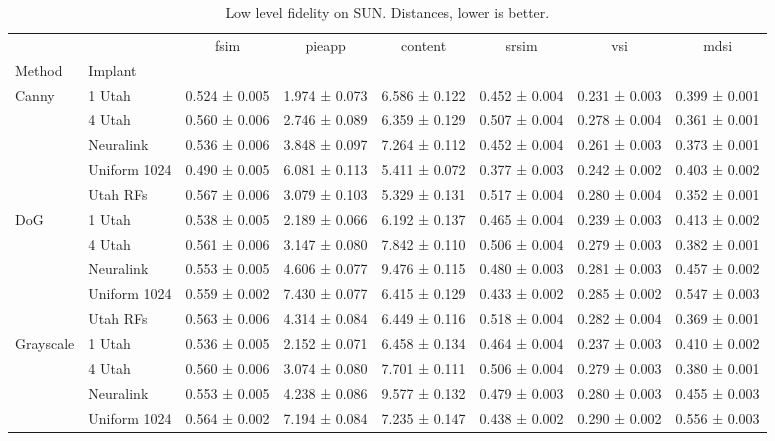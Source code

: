 \begin{table}
\caption{Low level fidelity on SUN. Distances, lower is better.}
\label{tab:low_sun}
\begin{tabular}{llcccccc}
\toprule
 &  & fsim & pieapp & content & srsim & vsi & mdsi \\
Method & Implant &  &  &  &  &  &  \\
\midrule
\multirow[t]{5}{*}{Canny} & 1 Utah & 0.524 ± 0.005 & 1.974 ± 0.073 & 6.586 ± 0.122 & 0.452 ± 0.004 & 0.231 ± 0.003 & 0.399 ± 0.001 \\
 & 4 Utah & 0.560 ± 0.006 & 2.746 ± 0.089 & 6.359 ± 0.129 & 0.507 ± 0.004 & 0.278 ± 0.004 & 0.361 ± 0.001 \\
 & Neuralink & 0.536 ± 0.006 & 3.848 ± 0.097 & 7.264 ± 0.112 & 0.452 ± 0.004 & 0.261 ± 0.003 & 0.373 ± 0.001 \\
 & Uniform 1024 & 0.490 ± 0.005 & 6.081 ± 0.113 & 5.411 ± 0.072 & 0.377 ± 0.003 & 0.242 ± 0.002 & 0.403 ± 0.002 \\
 & Utah RFs & 0.567 ± 0.006 & 3.079 ± 0.103 & 5.329 ± 0.131 & 0.517 ± 0.004 & 0.280 ± 0.004 & 0.352 ± 0.001 \\
\cline{1-8}
\multirow[t]{5}{*}{DoG} & 1 Utah & 0.538 ± 0.005 & 2.189 ± 0.066 & 6.192 ± 0.137 & 0.465 ± 0.004 & 0.239 ± 0.003 & 0.413 ± 0.002 \\
 & 4 Utah & 0.561 ± 0.006 & 3.147 ± 0.080 & 7.842 ± 0.110 & 0.506 ± 0.004 & 0.279 ± 0.003 & 0.382 ± 0.001 \\
 & Neuralink & 0.553 ± 0.005 & 4.606 ± 0.077 & 9.476 ± 0.115 & 0.480 ± 0.003 & 0.281 ± 0.003 & 0.457 ± 0.002 \\
 & Uniform 1024 & 0.559 ± 0.002 & 7.430 ± 0.077 & 6.415 ± 0.129 & 0.433 ± 0.002 & 0.285 ± 0.002 & 0.547 ± 0.003 \\
 & Utah RFs & 0.563 ± 0.006 & 4.314 ± 0.084 & 6.449 ± 0.116 & 0.518 ± 0.004 & 0.282 ± 0.004 & 0.369 ± 0.001 \\
\cline{1-8}
\multirow[t]{5}{*}{Grayscale} & 1 Utah & 0.536 ± 0.005 & 2.152 ± 0.071 & 6.458 ± 0.134 & 0.464 ± 0.004 & 0.237 ± 0.003 & 0.410 ± 0.002 \\
 & 4 Utah & 0.560 ± 0.006 & 3.074 ± 0.080 & 7.701 ± 0.111 & 0.506 ± 0.004 & 0.279 ± 0.003 & 0.380 ± 0.001 \\
 & Neuralink & 0.553 ± 0.005 & 4.238 ± 0.086 & 9.577 ± 0.132 & 0.479 ± 0.003 & 0.280 ± 0.003 & 0.455 ± 0.003 \\
 & Uniform 1024 & 0.564 ± 0.002 & 7.194 ± 0.084 & 7.235 ± 0.147 & 0.438 ± 0.002 & 0.290 ± 0.002 & 0.556 ± 0.003 \\

\end{tabular}
\end{table}
